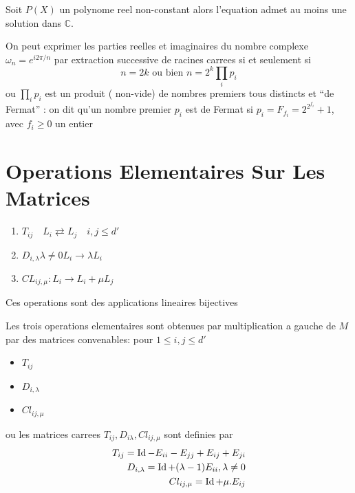 \documentclass[../main.tex]{subfiles}
\begin{document}
\begin{thm}
	Soit $P( X) $ un polynome reel non-constant alors l'equation admet au moins une solution dans $\mathbb{C}$.
\end{thm}
\begin{thm}
On peut exprimer les parties reelles et imaginaires du nombre complexe $\omega_n = e^{i 2 \pi / n} $ par extraction successive de racines carrees si et seulement si
\[ 
n=2k \text{ ou bien  } n = 2^{k} \prod_i p_i
\]
ou $\prod_i p_i$ est un produit ( non-vide) de nombres premiers tous distincts et ``de Fermat'' : on dit qu'un nombre premier $p_i$ est de Fermat si $p_i = F_{f_i} = 2^{2^{f_i}}+1$, avec $f_i \geq 0$ un entier
\end{thm}
\section{Operations Elementaires Sur Les Matrices}
\begin{defn}
	\begin{enumerate}
	\item $T_{ij} \quad L_i \rightleftarrows L_j\quad i,j \leq d'$ 
	\item $D_{i,\lambda} \lambda\neq 0 L_i \to \lambda L_i$
	\item $CL_{ij,\mu} : L_i \to L_i + \mu L_j$
	\end{enumerate}
\end{defn}
\begin{propo}
Ces operations sont des applications lineaires bijectives
\end{propo}
\begin{propo}
Les trois operations elementaires sont obtenues par multiplication a gauche de $M$ par des matrices convenables: pour $1\leq i,j \leq d'$ 
\begin{itemize}
\item $T_{ij} $ 
\item $D_{i,\lambda} $ 
\item $Cl_{ij,\mu} $
\end{itemize}
ou les matrices carrees $T_{ij} , D_{i\lambda} , Cl_{ij,\mu} $ sont definies par
\begin{align*}
T_{ij}  = \operatorname*{Id} -E_{ii}  - E_{jj} + E_{ij} + E_{ji} \\
D_{i,\lambda} = \operatorname*{Id} + ( \lambda -1)  E_{ii} , \lambda\neq 0\\
Cl_{ij,\mu}  = \operatorname*{Id} + \mu. E_{ij} 
\end{align*}

\end{propo}
\end{document}
